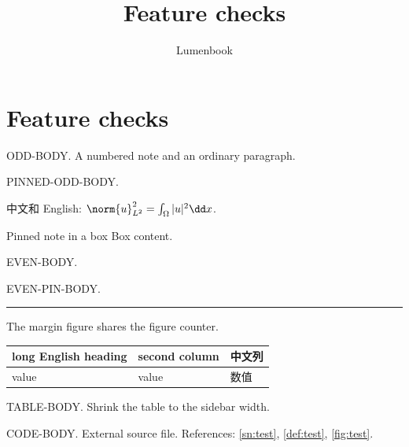 \expandafter\documentclass\expandafter[\TestOptions]{lumenbook}
\title{Feature checks}
\author{Lumenbook}
\begin{document}
\chapter{Feature checks}
ODD-BODY. A numbered note
and an ordinary paragraph.
\vspace{30mm}\par
PINNED-ODD-BODY.
\begin{definition}\label{def:test}
中文和 English: $\norm{u}_{L^2}^2=\int_\Omega |u|^2\dd x$.
\end{definition}
\begin{readingbox}{Pinned note in a box}
Box content.
\end{readingbox}
\newpage
EVEN-BODY.
\vspace{20mm}\par
EVEN-PIN-BODY.
\vspace{20mm}\par
\begin{marginfigure}[0pt]
  \rule{\linewidth}{6mm}
  \caption{PINNED-FIGURE. 中文图题。}\label{fig:test}
\end{marginfigure}
The margin figure shares the figure counter.
\vspace{30mm}\par
\begin{margintable}
  \caption{A table too wide at natural size}
  \begin{smalltable}
  \begin{tabular}{lll}\toprule
  long English heading & second column & 中文列\\\midrule
  value & value & 数值\\\bottomrule
  \end{tabular}
  \end{smalltable}
\end{margintable}
TABLE-BODY. Shrink the table to the sidebar width.
\vspace{30mm}\par
{}
CODE-BODY. External source file.
References: \ref{sn:test}, \ref{def:test}, \ref{fig:test}.
\end{document}
